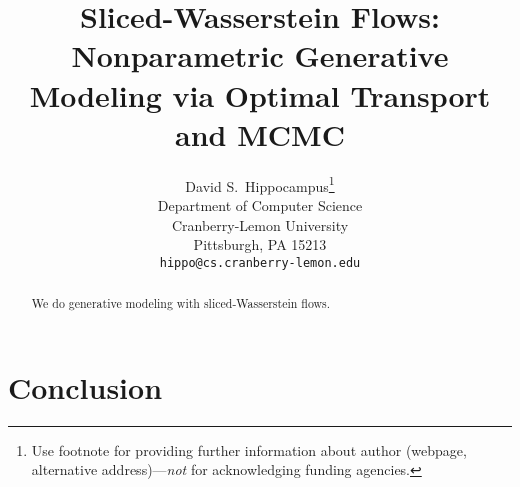 \documentclass{article}
\title{Sliced-Wasserstein Flows: Nonparametric Generative Modeling via Optimal Transport and MCMC}
\author{
  David S.~Hippocampus\thanks{Use footnote for providing further
    information about author (webpage, alternative
    address)---\emph{not} for acknowledging funding agencies.} \\
  Department of Computer Science\\
  Cranberry-Lemon University\\
  Pittsburgh, PA 15213 \\
  \texttt{hippo@cs.cranberry-lemon.edu} \\
}
\begin{document}

\maketitle

\begin{abstract}
We do generative modeling with sliced-Wasserstein flows. 
\end{abstract}














\section{Conclusion}





\end{document}
